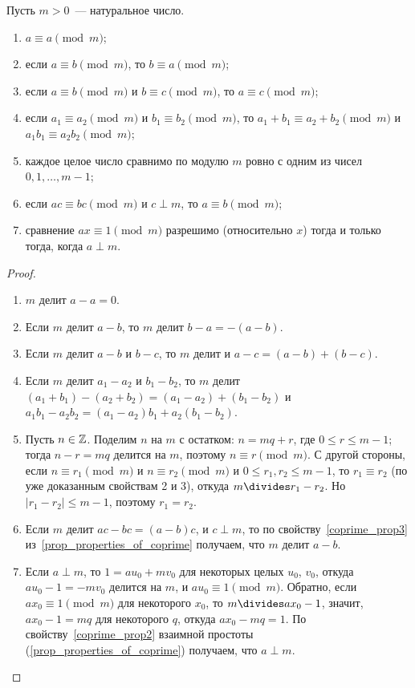 \begin{proposition}\label{prop_congruences}
Пусть $m>0$~--- натуральное число.
\begin{enumerate}
\item $a\equiv a\pmod m$;
\item если $a\equiv b\pmod m$, то $b\equiv a\pmod m$;
\item если $a\equiv b\pmod m$ и $b\equiv c\pmod m$, то $a\equiv c\pmod
  m$;
\item если $a_1\equiv a_2\pmod m$ и $b_1\equiv b_2\pmod m$, то
  $a_1+b_1\equiv a_2+b_2\pmod m$ и $a_1b_1\equiv a_2b_2\pmod
  m$;\label{congruences_prop4}
\item каждое целое число сравнимо по модулю $m$ ровно с одним из чисел
  $0,1,\dots,m-1$;\label{congruences_prop5}
\item если $ac\equiv bc\pmod m$ и $c\perp m$, то $a\equiv b\pmod m$;
\item сравнение $ax\equiv 1\pmod m$ разрешимо (относительно $x$) тогда
  и только тогда, когда $a\perp m$.\label{congruences_prop7}
\end{enumerate}
\end{proposition}
\begin{proof}
\begin{enumerate}
\item $m$ делит $a-a=0$.
\item Если $m$ делит $a-b$, то $m$ делит $b-a=-(a-b)$.
\item Если $m$ делит $a-b$ и $b-c$, то $m$ делит и
  $a-c=(a-b)+(b-c)$.
\item Если $m$ делит $a_1-a_2$ и $b_1-b_2$, то $m$ делит
  $(a_1+b_1)-(a_2+b_2)=(a_1-a_2)+(b_1-b_2)$ и
  $a_1b_1-a_2b_2=(a_1-a_2)b_1+a_2(b_1-b_2)$.
\item Пусть $n\in\mathbb Z$. Поделим $n$ на $m$ с остатком: $n=mq+r$, где
  $0\leq r\leq m-1$; тогда $n-r=mq$ делится на $m$, поэтому $n\equiv
  r\pmod m$. С другой стороны, если $n\equiv r_1\pmod m$ и $n\equiv
  r_2\pmod m$ и $0\leq r_1,r_2\leq m-1$, то $r_1\equiv r_2$ (по уже
  доказанным
  свойствам 2 и 3), откуда $m\divides r_1-r_2$. Но $|r_1-r_2|\leq m-1$,
  поэтому $r_1=r_2$.
\item Если $m$ делит $ac-bc = (a-b)c$, и $c\perp m$, то по
  свойству~\ref{coprime_prop3}
  из~\ref{prop_properties_of_coprime}
  получаем, что $m$ делит $a-b$.
\item Если $a\perp m$, то $1=au_0+mv_0$ для некоторых целых $u_0$,
  $v_0$, откуда $au_0-1=-mv_0$ делится на $m$, и $au_0\equiv 1\pmod
  m$. Обратно, если $ax_0\equiv 1\pmod m$ для некоторого $x_0$, то
  $m\divides ax_0-1$, значит, $ax_0-1=mq$ для некоторого $q$, откуда
  $ax_0-mq=1$. По свойству~\ref{coprime_prop2} взаимной
  простоты (\ref{prop_properties_of_coprime}) получаем, что
  $a\perp m$.
\end{enumerate}
\end{proof}

